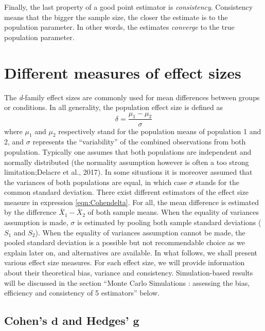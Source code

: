\documentclass[
  english,
  man,floatsintext]{apa6}
\begin{document}
Finally, the last property of a good point estimator is \emph{consistency}. Consistency means that the bigger the sample size, the closer the estimate is to the population parameter. In other words, the estimates \emph{converge} to the true population parameter.

\hypertarget{different-measures-of-effect-sizes}{%
\section{Different measures of effect sizes}\label{different-measures-of-effect-sizes}}

The \emph{d}-family effect sizes are commonly used for mean differences between groups or conditions. In all generality, the population effect size is defined as
\begin{equation} 
\delta = \frac{\mu_{1}-\mu_{2}}{\sigma} 
\label{eqn:Cohendelta}
\end{equation}
where \(\mu_1\) and \(\mu_2\) respectively stand for the population means of population 1 and 2, and \(\sigma\) represents the ``variability'' of the combined observations from both population. Typically one assumes that both populations are independent and normally distributed (the normality assumption however is often a too strong limitation;Delacre et al., 2017). In some situations it is moreover assumed that the variances of both populations are equal, in which case \(\sigma\) stands for the common standard deviation. There exist different estimators of the effect size measure in expression \ref{eqn:Cohendelta}. For all, the mean difference is estimated by the difference \(\bar{X}_1-\bar{X}_2\) of both sample means. When the equality of variances assumption is made, \(\sigma\) is estimated by pooling both sample standard deviations (\(S_1\) and \(S_2\)). When the equality of variances assumption cannot be made, the pooled standard deviation is a possible but not recommendable choice as we explain later on, and alternatives are available. In what follows, we shall present various effect size measures. For each effect size, we will provide information about their theoretical bias, variance and consistency. Simulation-based results will be discussed in the section ``Monte Carlo Simulations : assessing the bias, efficiency and consistency of 5 estimators'' below.

\hypertarget{cohens-bmd-and-hedges-bmg}{%
\subsection{\texorpdfstring{Cohen's \(\bm{d}\) and Hedges' \(\bm{g}\)}{Cohen's \textbackslash bm\{d\} and Hedges' \textbackslash bm\{g\}}}\label{cohens-bmd-and-hedges-bmg}}
\end{document}
